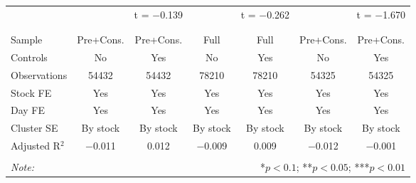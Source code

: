\begin{table}[H]
\begin{tabular}{@{\extracolsep{5pt}}lcccccc}
  &  & t = $-$0.139 &  & t = $-$0.262 &  & t = $-$1.670 \\ 
  & & & & & & \\ 
\hline \\[-1.8ex] 
Sample & Pre+Cons. & Pre+Cons. & Full & Full & Pre+Cons. & Pre+Cons. \\ 
Controls & No & Yes & No & Yes & No & Yes \\ 
Observations & 54432 & 54432 & 78210 & 78210 & 54325 & 54325 \\ 
Stock FE & Yes & Yes & Yes & Yes & Yes & Yes \\ 
Day FE & Yes & Yes & Yes & Yes & Yes & Yes \\ 
Cluster SE & By stock & By stock & By stock & By stock & By stock & By stock \\ 
Adjusted R$^{2}$ & $-$0.011 & 0.012 & $-$0.009 & 0.009 & $-$0.012 & $-$0.001 \\ 
\hline 
\hline \\[-1.8ex] 
\textit{Note:}  & \multicolumn{6}{r}{*$p < 0.1$; **$p < 0.05$; ***$p < 0.01$} \\ 
\end{tabular} 
\end{table} 

